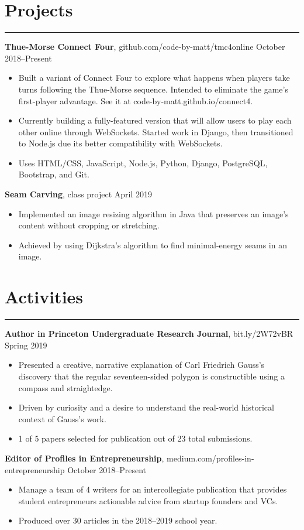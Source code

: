 \documentclass[11pt]{article}
\newcommand{\resumesection}[1]{\vspace{-0.2cm}\section*{#1}\vspace{-0.2cm}\hrule\vspace{0.2cm}}
\begin{document}
\resumesection{Projects}

\textbf{Thue-Morse Connect Four}, github.com/code-by-matt/tmc4online  \hfill October 2018--Present
\begin{itemize}
	\item Built a variant of Connect Four to explore what happens when players take turns following the Thue-Morse sequence. Intended to eliminate the game's first-player advantage. See it at code-by-matt.github.io/connect4.
	\item Currently building a fully-featured version that will allow users to play each other online through WebSockets. Started work in Django, then transitioned to Node.js due its better compatibility with WebSockets.
	\item Uses HTML/CSS, JavaScript, Node.js, Python, Django, PostgreSQL, Bootstrap, and Git.
\end{itemize}

\textbf{Seam Carving}, class project \hfill April 2019
\begin{itemize}
	\item Implemented an image resizing algorithm in Java that preserves an image's content without cropping or stretching.
	\item Achieved by using Dijkstra's algorithm to find minimal-energy seams in an image.
\end{itemize}

\resumesection{Activities}

\textbf{Author in Princeton Undergraduate Research Journal}, bit.ly/2W72vBR \hfill Spring 2019
\begin{itemize}
	\item Presented a creative, narrative explanation of Carl Friedrich Gauss's discovery that the regular seventeen-sided polygon is constructible using a compass and straightedge.
	\item Driven by curiosity and a desire to understand the real-world historical context of Gauss's work.
	\item 1 of 5 papers selected for publication out of 23 total submissions.
\end{itemize}

\textbf{Editor of Profiles in Entrepreneurship}, medium.com/profiles-in-entrepreneurship \hfill October 2018--Present
\begin{itemize}
	\item Manage a team of 4 writers for an intercollegiate publication that provides student entrepreneurs actionable advice from startup founders and VCs.
	\item Produced over 30 articles in the 2018--2019 school year.
\end{itemize}
\end{document}
